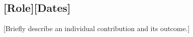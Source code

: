 \subsection{[Role]\hfill [Dates]}
\begin{zitemize}
  \item {[Briefly describe an individual contribution and its outcome.]}
\end{zitemize}
